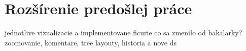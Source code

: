 \section{Rozšírenie predošlej práce}
jednotlive vizualizacie a implementovane ficurie
co sa zmenilo od bakalarky? zoomovanie, komentare, tree layouty, historia a nove ds

